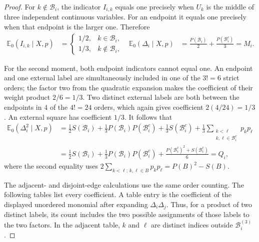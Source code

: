 \begin{proof}
For $k\notin\mathcal B_i$, the indicator $I_{i,k}$ equals one precisely when
$U_k$ is the middle of three independent continuous variables. For an
endpoint it equals one precisely when that endpoint is the larger one.
Therefore
\begin{align*}
  \mathbb E_0(I_{i,k}\mid X,p)
  &=
  \begin{cases}
    1/2,&k\in\mathcal B_i,\\
    1/3,&k\notin\mathcal B_i,
  \end{cases}
  &
  \mathbb E_0(\Delta_i\mid X,p)
  &=\frac{P(\mathcal B_i)}2+\frac{P(\mathcal B_i^c)}3
   =M_i.
\end{align*}

For the second moment, both endpoint indicators cannot equal one. An
endpoint and one external label are simultaneously included in one of the
$3!=6$ strict orders; the factor two from the quadratic expansion makes the
coefficient of their weight product $2/6=1/3$. Two distinct external labels
are both between the endpoints in $4$ of the $4!=24$ orders, which again
gives coefficient $2(4/24)=1/3$. An external square has coefficient $1/3$.
It follows that
\begin{align*}
  \mathbb E_0(\Delta_i^2\mid X,p)
  &=\frac12S(\mathcal B_i)
    +\frac13P(\mathcal B_i)P(\mathcal B_i^c)
    +\frac13S(\mathcal B_i^c)
    +\frac13\sum_{\substack{k<\ell\\k,\ell\in\mathcal B_i^c}}
      p_kp_\ell\\
  &=\frac12S(\mathcal B_i)
    +\frac13P(\mathcal B_i)P(\mathcal B_i^c)
    +\frac{P(\mathcal B_i^c)^2+S(\mathcal B_i^c)}6
   =Q_i,
\end{align*}
where the second equality uses
$2\sum_{k<\ell;\,k,\ell\in B}p_kp_\ell=P(B)^2-S(B)$.

The adjacent- and disjoint-edge calculations use the same order counting.
The following tables list every coefficient. A table entry is the coefficient
of the displayed unordered monomial after expanding $\Delta_i\Delta_j$. Thus,
for a product of two distinct labels, its count includes the two possible
assignments of those labels to the two factors. In the adjacent table, $k$
and $\ell$ are distinct indices outside $\mathcal B_i^{(3)}$.


\end{proof}

